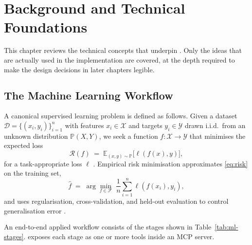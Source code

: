 \chapter{Background and Technical Foundations}
\label{ch:background}

This chapter reviews the technical concepts that underpin \projname.
Only the ideas that are actually used in the implementation are
covered, at the depth required to make the design decisions in later
chapters legible.

\section{The Machine Learning Workflow}
\label{sec:ml-workflow}

A canonical supervised learning problem is defined as follows. Given a
dataset $\mathcal{D}=\{(x_i, y_i)\}_{i=1}^{n}$ with features
$x_i \in \mathcal{X}$ and targets $y_i \in \mathcal{Y}$ drawn i.i.d.\
from an unknown distribution $\mathbb{P}(X,Y)$, we seek a function
$f:\mathcal{X}\to\mathcal{Y}$ that minimises the expected loss
\begin{equation}
  \mathcal{R}(f) \;=\; \mathbb{E}_{(x,y)\sim\mathbb{P}}\big[\ell(f(x), y)\big],
  \label{eq:risk}
\end{equation}
for a task-appropriate loss $\ell$ \citep{vapnik1998statistical}.
Empirical risk minimisation approximates \eqref{eq:risk} on the
training set,
\begin{equation}
  \hat{f} \;=\; \arg\min_{f\in\mathcal{F}}\;
  \frac{1}{n}\sum_{i=1}^{n} \ell(f(x_i), y_i),
  \label{eq:erm}
\end{equation}
and uses regularisation, cross-validation, and held-out evaluation to
control generalisation error \citep{hastie2009elements}.

An end-to-end applied workflow consists of the stages shown in
Table~\ref{tab:ml-stages}. \projname{} exposes each stage as one or
more tools inside an MCP server.

